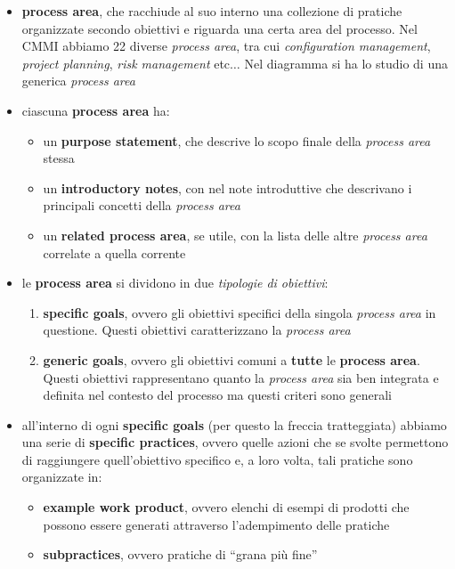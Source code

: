 \documentclass[a4paper,12pt, oneside]{book}
\begin{document}
\begin{itemize}
  \item \textbf{process area}, che racchiude al suo interno una collezione di
  pratiche organizzate secondo obiettivi e riguarda una certa area del
  processo. Nel CMMI abbiamo 22 diverse \textit{process area}, tra cui
  \textit{configuration management}, \textit{project planning}, \textit{risk
    management} etc$\ldots$ Nel diagramma si ha lo studio di una generica
  \textit{process area}
  \item ciascuna \textbf{process area} ha:
  \begin{itemize}
    \item un \textbf{purpose statement}, che descrive lo scopo finale della
    \textit{process area} stessa
    \item un \textbf{introductory notes}, con nel note introduttive che
    descrivano i principali concetti della \textit{process area}
    \item un \textbf{related process area}, se utile, con la lista delle altre
    \textit{process area} correlate a quella corrente
  \end{itemize}
  \item le \textbf{process area} si dividono in due \textit{tipologie di
    obiettivi}:
  \begin{enumerate}
    \item \textbf{specific goals}, ovvero gli obiettivi specifici della singola
    \textit{process area} in questione. Questi obiettivi caratterizzano la
    \textit{process area}
    \item \textbf{generic goals}, ovvero gli obiettivi comuni a \textbf{tutte}
    le \textbf{process area}. Questi obiettivi rappresentano quanto la
    \textit{process area} sia ben integrata e definita nel contesto del processo
    ma questi criteri sono generali
  \end{enumerate}
  \item all'interno di ogni \textbf{specific goals} (per questo la freccia
  tratteggiata) abbiamo una serie di \textbf{specific practices}, ovvero quelle
  azioni che se svolte permettono di raggiungere quell'obiettivo specifico e, a
  loro volta, tali pratiche sono organizzate in:
  \begin{itemize}
    \item \textbf{example work product}, ovvero elenchi di esempi di prodotti
    che possono essere generati attraverso l'adempimento delle pratiche
    \item \textbf{subpractices}, ovvero pratiche di ``grana più fine''

\end{itemize}
\end{itemize}
\end{document}
